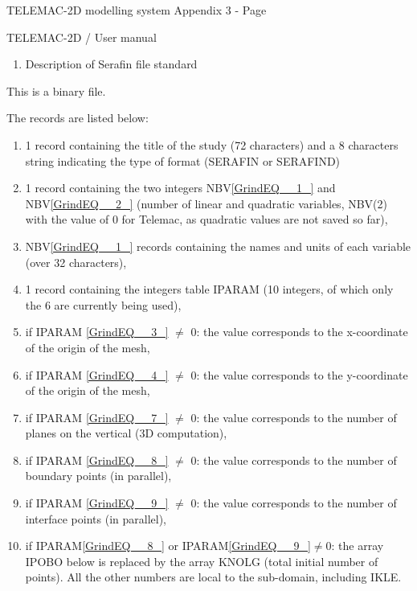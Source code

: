 \documentclass{article} %
\begin{document}
 TELEMAC-2D modelling system Appendix 3 - Page

 TELEMAC-2D / User manual



\begin{enumerate}
\item   Description of Serafin file standard
\end{enumerate}



 This is a binary file.

 The records are listed below:

\begin{enumerate}
\item  1 record containing the title of the study (72 characters) and a 8 characters string indicating the type of format (SERAFIN or SERAFIND)

\item  1 record containing the two integers NBV\eqref{GrindEQ__1_} and NBV\eqref{GrindEQ__2_} (number of linear and quadratic variables, NBV(2) with the value of 0 for Telemac, as quadratic values are not saved so far),

\item  NBV\eqref{GrindEQ__1_} records containing the names and units of each variable (over 32 characters),

\item  1 record containing the integers table IPARAM (10 integers, of which only the 6 are currently being used),

\item  if IPARAM \eqref{GrindEQ__3_} $\neq$ 0: the value corresponds to the x-coordinate of the origin of the mesh,

\item  if IPARAM \eqref{GrindEQ__4_} $\neq$ 0: the value corresponds to the y-coordinate of the origin of the mesh,

\item  if IPARAM \eqref{GrindEQ__7_} $\neq$ 0: the value corresponds to the number of  planes on the vertical (3D computation),

\item  if IPARAM \eqref{GrindEQ__8_} $\neq$ 0: the value corresponds to the number of boundary points (in parallel),

\item  if IPARAM \eqref{GrindEQ__9_} $\neq$ 0: the value corresponds to the number of interface points (in parallel),

\item  if IPARAM\eqref{GrindEQ__8_} or IPARAM\eqref{GrindEQ__9_}$\neq$0: the array IPOBO below is replaced by the array KNOLG (total initial number of points). All the other numbers are local to the sub-domain, including IKLE.


\end{enumerate}
\end{document}
